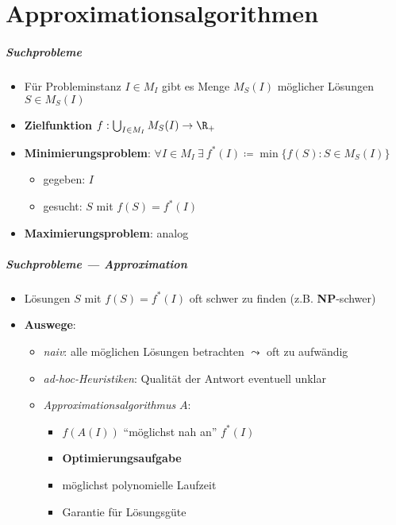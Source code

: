 \chapter{Approximationsalgorithmen}

\paragraph{Suchprobleme}
\begin{itemize}
  \item Für Probleminstanz $ I \in M_I $ gibt es Menge $ M_S(I) $ möglicher Lösungen $ S \in M_S(I) $
  \item \textbf{Zielfunktion} $ f: \bigcup_{I \in M_I} M_S(I) \to \R_+ $
  \item \textbf{Minimierungsproblem}: $ \forall I \in M_I \ \exists \ f^*(I) \coloneqq \min\{ f(S) : S \in M_S(I) \} $
  \begin{itemize}
    \item gegeben: $ I $
    \item gesucht: $ S $ mit $ f(S) = f^*(I) $
  \end{itemize}
  \item \textbf{Maximierungsproblem}: analog
\end{itemize}

\paragraph{Suchprobleme --- Approximation}
\begin{itemize}
  \item Lösungen $ S $ mit $ f(S) = f^*(I) $ oft schwer zu finden (z.B. \textbf{NP}-schwer)
  \item \textbf{Auswege}:
  \begin{itemize}
    \item \emph{naiv}: alle möglichen Lösungen betrachten $ \leadsto $ oft zu aufwändig
    \item \emph{ad-hoc-Heuristiken}: Qualität der Antwort eventuell unklar
    \item \emph{Approximationsalgorithmus} $ A $:
    \begin{itemize}
      \item $ f(A(I)) $ ``möglichst nah an'' $ f^*(I) $
      \item \textbf{Optimierungsaufgabe}
      \item möglichst polynomielle Laufzeit
      \item Garantie für Lösungsgüte
    \end{itemize}
  \end{itemize}
\end{itemize}

